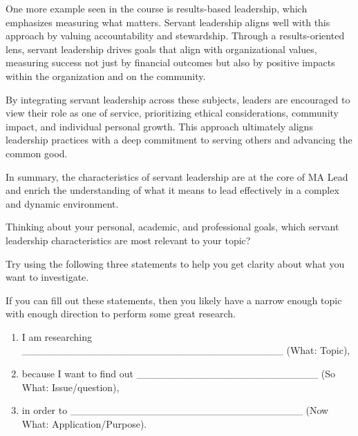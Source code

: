 \documentclass[
  letterpaper,
  DIV=11,
  numbers=noendperiod]{scrreprt}
\providecommand{\tightlist}{%
  \setlength{\itemsep}{0pt}\setlength{\parskip}{0pt}}\usepackage{longtable,booktabs,array}
\begin{document}
One more example seen in the course is results-based leadership, which
emphasizes measuring what matters. Servant leadership aligns well with
this approach by valuing accountability and stewardship. Through a
results-oriented lens, servant leadership drives goals that align with
organizational values, measuring success not just by financial outcomes
but also by positive impacts within the organization and on the
community.

By integrating servant leadership across these subjects, leaders are
encouraged to view their role as one of service, prioritizing ethical
considerations, community impact, and individual personal growth. This
approach ultimately aligns leadership practices with a deep commitment
to serving others and advancing the common good.

In summary, the characteristics of servant leadership are at the core of
MA Lead and enrich the understanding of what it means to lead
effectively in a complex and dynamic environment.

Thinking about your personal, academic, and professional goals, which
servant leadership characteristics are most relevant to your topic?

Try using the following three statements to help you get clarity about
what you want to investigate.

If you can fill out these statements, then you likely have a narrow
enough topic with enough direction to perform some great research.

\begin{enumerate}
\def\labelenumi{\arabic{enumi}.}
\tightlist
\item
  I am researching
  \_\_\_\_\_\_\_\_\_\_\_\_\_\_\_\_\_\_\_\_\_\_\_\_\_\_\_\_\_\_\_\_\_\_\_\_
  (What: Topic),
\item
  because I want to find out
  \_\_\_\_\_\_\_\_\_\_\_\_\_\_\_\_\_\_\_\_\_\_\_\_\_ (So What:
  Issue/question),
\item
  in order to
  \_\_\_\_\_\_\_\_\_\_\_\_\_\_\_\_\_\_\_\_\_\_\_\_\_\_\_\_\_\_\_\_ (Now
  What: Application/Purpose).
\end{enumerate}


\chapter*{}\label{section-3}

\markboth{}{}
\end{document}
